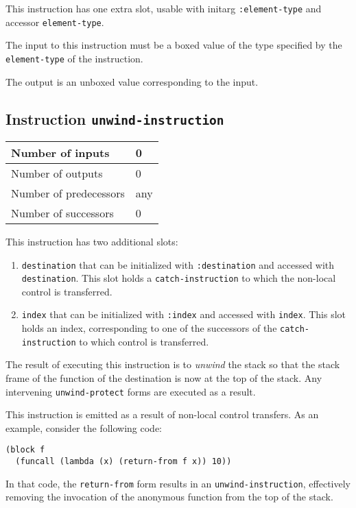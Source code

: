 This instruction has one extra slot, usable with initarg
\texttt{:element-type} and accessor \texttt{element-type}.

The input to this instruction must be a boxed value of the type
specified by the \texttt{element-type} of the instruction.

The output is an unboxed value corresponding to the input.

\subsection{Instruction \texttt{unwind-instruction}}
\label{hir-instruction-unwind}

\begin{tabular}{|l|l|}
\hline
Number of inputs & 0\\
\hline
Number of outputs & 0\\
\hline
Number of predecessors & any\\
\hline
Number of successors & 0\\
\hline
\end{tabular}

This instruction has two additional slots:

\begin{enumerate}
\item \texttt{destination} that can be initialized with
  \texttt{:destination} and accessed with \texttt{destination}.  This
  slot holds a \texttt{catch-instruction} to which the non-local
  control is transferred.
\item \texttt{index} that can be initialized with \texttt{:index} and
  accessed with \texttt{index}.  This slot holds an index,
  corresponding to one of the successors of the
  \texttt{catch-instruction} to which control is transferred.
\end{enumerate}

The result of executing this instruction is to \emph{unwind} the stack
so that the stack frame of the function of the destination is now at
the top of the stack.  Any intervening \texttt{unwind-protect} forms
are executed as a result.

This instruction is emitted as a result of non-local control
transfers.  As an example, consider the following code:

\begin{verbatim}
(block f
  (funcall (lambda (x) (return-from f x)) 10))
\end{verbatim}

In that code, the \texttt{return-from} form results in an
\texttt{unwind-instruction}, effectively removing the invocation of
the anonymous function from the top of the stack.

